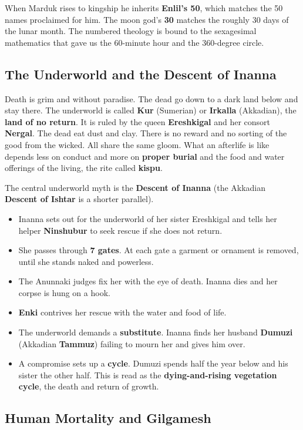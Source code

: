When Marduk rises to kingship he inherits \textbf{Enlil's 50}, which matches the 50 names proclaimed for him. The moon god's \textbf{30} matches the roughly 30 days of the lunar month. The numbered theology is bound to the sexagesimal mathematics that gave us the 60-minute hour and the 360-degree circle.

\subsection{The Underworld and the Descent of Inanna}

Death is grim and without paradise. The dead go down to a dark land below and stay there. The underworld is called \textbf{Kur} (Sumerian) or \textbf{Irkalla} (Akkadian), the \textbf{land of no return}. It is ruled by the queen \textbf{Ereshkigal} and her consort \textbf{Nergal}. The dead eat dust and clay. There is no reward and no sorting of the good from the wicked. All share the same gloom. What an afterlife is like depends less on conduct and more on \textbf{proper burial} and the food and water offerings of the living, the rite called \textbf{kispu}.

The central underworld myth is the \textbf{Descent of Inanna} (the Akkadian \textbf{Descent of Ishtar} is a shorter parallel).

\begin{itemize}
 \item Inanna sets out for the underworld of her sister Ereshkigal and tells her helper \textbf{Ninshubur} to seek rescue if she does not return.
 \item She passes through \textbf{7 gates}. At each gate a garment or ornament is removed, until she stands naked and powerless.
 \item The Anunnaki judges fix her with the eye of death. Inanna dies and her corpse is hung on a hook.
 \item \textbf{Enki} contrives her rescue with the water and food of life.
 \item The underworld demands a \textbf{substitute}. Inanna finds her husband \textbf{Dumuzi} (Akkadian \textbf{Tammuz}) failing to mourn her and gives him over.
 \item A compromise sets up a \textbf{cycle}. Dumuzi spends half the year below and his sister the other half. This is read as the \textbf{dying-and-rising vegetation cycle}, the death and return of growth.
\end{itemize}

\subsection{Human Mortality and Gilgamesh}

